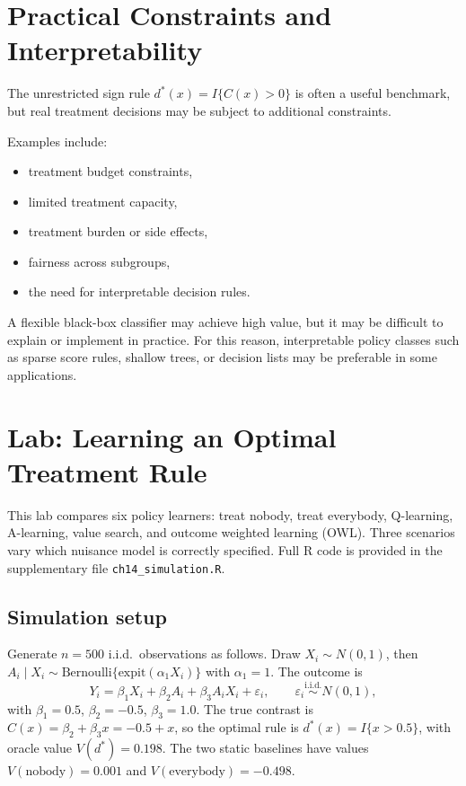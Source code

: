 \documentclass[master.tex]{subfiles}
\begin{document}
\section{Practical Constraints and Interpretability}
\label{w14:sec:constraints}

The unrestricted sign rule \(d^\ast(x)=I\{C(x)>0\}\) is often a useful benchmark, but real treatment decisions may be subject to additional constraints.

Examples include:
\begin{itemize}
    \item treatment budget constraints,
    \item limited treatment capacity,
    \item treatment burden or side effects,
    \item fairness across subgroups,
    \item the need for interpretable decision rules.
\end{itemize}

A flexible black-box classifier may achieve high value, but it may be difficult to explain or implement in practice. For this reason, interpretable policy classes such as sparse score rules, shallow trees, or decision lists may be preferable in some applications.

\section{Lab: Learning an Optimal Treatment Rule}
\label{w14:sec:lab}

This lab compares six policy learners: treat nobody, treat everybody,
Q-learning, A-learning, value search, and outcome weighted learning (OWL).
Three scenarios vary which nuisance model is correctly specified.
Full \textsf{R} code is provided in the supplementary file
\texttt{ch14\_simulation.R}.

\subsection{Simulation setup}
\label{w14:subsec:lab-setup}

Generate $n=500$ i.i.d.\ observations as follows. Draw $X_i\sim N(0,1)$,
then $A_i\mid X_i\sim\mathrm{Bernoulli}\{\mathrm{expit}(\alpha_1 X_i)\}$
with $\alpha_1=1$. The outcome is
\[
Y_i = \beta_1 X_i + \beta_2 A_i + \beta_3 A_i X_i + \varepsilon_i,
\qquad \varepsilon_i\overset{\mathrm{i.i.d.}}{\sim}N(0,1),
\]
with $\beta_1=0.5$, $\beta_2=-0.5$, $\beta_3=1.0$. The true contrast is
$C(x)=\beta_2+\beta_3 x = -0.5+x$, so the optimal rule is
$d^\ast(x)=I\{x>0.5\}$, with oracle value $V(d^\ast)=0.198$.
The two static baselines have values $V(\text{nobody})=0.001$ and
$V(\text{everybody})=-0.498$.
\end{document}
